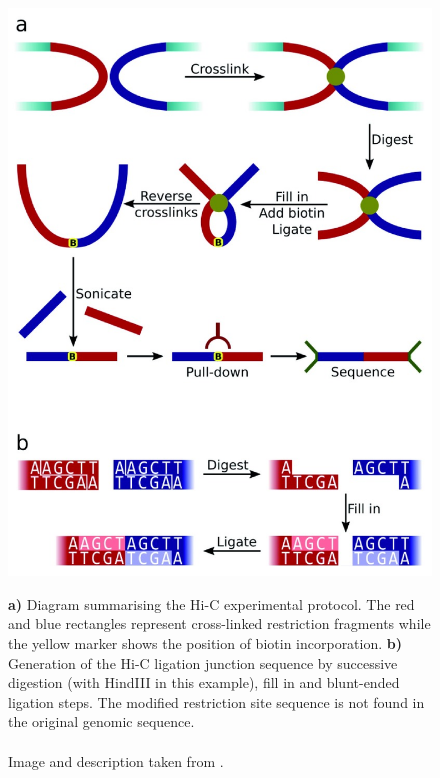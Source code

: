 \begin{figure}[t]
\begin{centering}
    {\includegraphics[scale=4]{figures/background/f1000research-4-7903-g0000.jpg}}
    \caption[Summarised Hi-C protocol]
    {\textbf{a)} Diagram summarising the Hi-C experimental protocol. The red and blue rectangles represent cross-linked restriction fragments while the yellow marker shows the position of biotin incorporation. \textbf{b)} Generation of the Hi-C ligation junction sequence by successive digestion (with HindIII in this example), fill in and blunt-ended ligation steps. The modified restriction site sequence is not found in the original genomic sequence. \\ \\ Image and description taken from \cite{wingett2015hicup}.}
    \label{fig:HiC}
\end{centering}
\end{figure}



